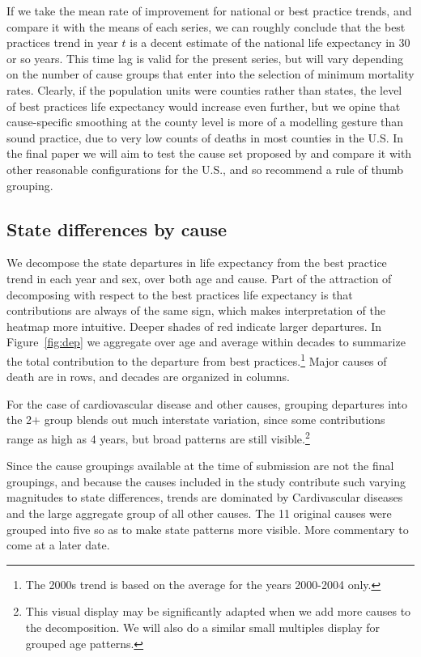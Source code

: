 \documentclass[11pt,oneside,a4paper]{article} %
\begin{document}
If we take the mean rate of improvement for national or best practice trends,
and compare it with the means of each series, we can roughly conclude that the
best practices trend in year $t$ is a decent estimate of the national life
expectancy in 30 or so years. This time lag is valid for the present series,
but will vary depending on the number of cause groups that enter into the
selection of minimum mortality rates. Clearly, if the population units were
counties rather than states, the level of best practices life expectancy would
increase even further, but we opine that cause-specific smoothing at the county
level is more of a modelling gesture than sound practice, due to very low counts of deaths in
most counties in the U.S. In the final paper we will aim to test the cause set
proposed by \citet{vallin2008minimum} and compare it with other reasonable
configurations for the U.S., and so recommend a rule of thumb grouping.

\FloatBarrier
\subsection*{State differences by cause}

We decompose the state departures in life expectancy from the best practice
trend in each year and sex, over both age and cause. Part of the attraction of decomposing with respect to the best practices life expectancy is that contributions are always
of the same sign, which makes interpretation of the heatmap more intuitive.
Deeper shades of red indicate larger departures. In Figure~\ref{fig:dep}
we aggregate over age and average within decades to summarize the total
contribution to the departure from best practices.\footnote{The 2000s trend is
based on the average for the years 2000-2004 only.} Major causes of death are in
rows, and decades are organized in columns.

For the case of cardiovascular disease
and other causes, grouping departures into the 2$+$ group blends out much
interstate variation, since some contributions range as high as 4
years, but broad patterns are still visible.\footnote{This visual display may be
significantly adapted when we add more causes to the decomposition. We will also do a similar small multiples
display for grouped age patterns.}

Since the cause groupings available at the time of submission are not the final groupings, and
because the causes included in the study contribute such varying magnitudes to
state differences, trends are dominated by Cardivascular diseases and the large
aggregate group of all other causes. The 11 original causes were grouped into
five so as to make state patterns more visible. More commentary to come at a
later date.
\end{document}
